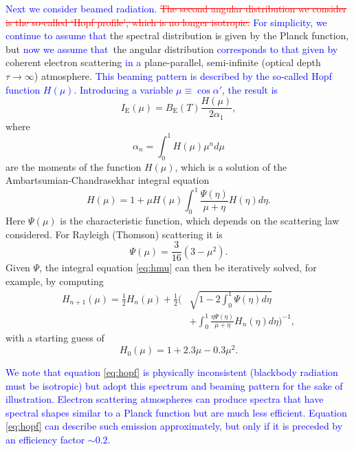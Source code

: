 \documentclass{aa}
\newcommand{\refe}[1]{\textcolor{blue}{{#1}}}
\newcommand{\refedel}[1]{\textcolor{red}{\sout{#1}}}
\begin{document}
\refe{Next we consider beamed radiation.}
\refedel{The second angular distribution we consider is the so-called `Hopf profile', which is no longer isotropic.}
\refe{For simplicity, we continue to assume that} the spectral distribution is given by the Planck function, but \refe{now we assume that} the angular distribution \refe{corresponds to that given by} coherent electron scattering \refe{in a} plane-parallel, semi-infinite (optical depth $\tau \rightarrow \infty$) atmosphere.
\refe{This beaming pattern is described by the so-called Hopf function $H(\mu)$.}
\refe{Introducing a variable $\mu \equiv \cos\alpha'$, the result is}
\begin{equation}\label{eq:hopf}
  I_{\mathrm{E}}(\mu) = B_{\mathrm{E}}(T) \frac{H(\mu)}{2\alpha_1},
\end{equation}
where
\begin{equation}
  \alpha_n = \int_0^1 H(\mu) \mu^n d\mu
\end{equation}
are the moments of the function $H(\mu)$, which is a solution of the Ambartsumian-Chandrasekhar integral equation \citep[see e.g.][]{Cha60,Sob63}
\begin{equation}\label{eq:hmu}
  H(\mu) = 1 + \mu H(\mu) \int_0^1 \frac{\Psi(\eta)}{\mu + \eta} H(\eta) d\eta.
\end{equation}
Here $\Psi(\mu)$ is the characteristic function, which depends on the scattering law considered.
For Rayleigh (Thomson) scattering it is
\begin{equation}
  \Psi(\mu) = \frac{3}{16}(3-\mu^2).
\end{equation}
Given $\Psi$, the integral equation \eqref{eq:hmu} can then be iteratively solved, for example, by computing
\begin{equation}\begin{split}
    H_{n+1}(\mu) =  \frac{1}{2} H_n(\mu) + \frac{1}{2}\Biggl(& \sqrt{1-2\int_0^1 \Psi(\eta)d\eta} \\
                    &+ \int_0^1 \frac{\eta \Psi(\eta)}{\mu + \eta} H_n(\eta) d\eta \Biggr)^{-1},
\end{split}\end{equation}
with a starting guess of
\begin{equation}\label{eq:apprx_hopf}
  H_0(\mu) = 1 + 2.3\mu - 0.3\mu^2.
\end{equation}

\refe{We note that equation \eqref{eq:hopf} is physically inconsistent (blackbody radiation must be isotropic) but adopt this spectrum and beaming pattern for the sake of illustration. 
Electron scattering atmospheres can produce spectra that have spectral shapes similar to a Planck function but are much less efficient. 
Equation \eqref{eq:hopf} can describe such emission approximately, but only if it is preceded by an efficiency factor $\sim 0.2$.
}
\end{document}
